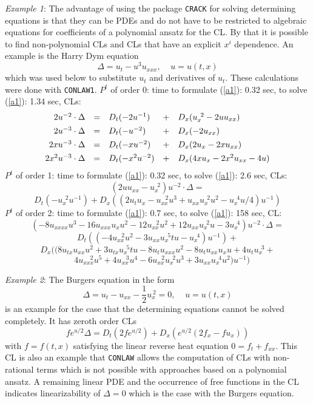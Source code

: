 {\it Example 1}: \newline
The advantage of using the package {\tt CRACK} for solving
determining equations is that they can be PDEs and do not have to be
restricted to algebraic equations for coefficients of a polynomial
ansatz for the CL. By that it is possible to find non-polynomial
CLs and CLs that have an explicit $x^i$ dependence.
An example is the Harry Dym equation
\[ \Delta = u_{t} - u^3u_{xxx}, \;\;\;\; u = u(t,x) \]
which was used below to substitute $u_{t}$ and derivatives of
$u_{t}$. These calculations were done with {\tt CONLAW1}.\newline
$P^t$ of order 0: time to formulate (\ref{a1}): 0.32 sec, to solve (\ref{a1}):
1.34 sec, CLs:
\[ \begin{array}{rclcl}
2u^{-2} \cdot \Delta & = & D_t(-2u^{-1}) & + & D_x(u_{x}^{\;\,2}-2uu_{xx}) \vspace{1.5mm} \\
2u^{-3} \cdot \Delta & = & D_t(-u^{-2}) & + & D_x(-2u_{xx}) \vspace{1.5mm} \\
2xu^{-3} \cdot \Delta & = & D_t(-xu^{-2}) & + & D_x(2u_{x}-2xu_{xx}) \vspace{1.5mm} \\
2x^2u^{-3} \cdot \Delta & = & D_t(-x^2u^{-2}) & + & D_x(4xu_{x}-2x^2u_{xx}-4u)
\end{array} \]
$P^t$ of order 1: time to formulate (\ref{a1}): 0.32 sec, to solve (\ref{a1}):
2.6 sec, CLs:
\[(2uu_{xx}-u_{x}^{\;\,2})u^{-2} \cdot \Delta = \]
\[D_t(-u_{x}^{\;\,2}u^{-1}) +
  D_x((2u_{t}u_{x}-u_{xx}^{\;\;\,2}u^3+
    u_{xx}u_{x}^{\;\,2}u^2-u_{x}^{\;\,4}u/4)u^{-1}) \]
$P^t$ of order 2: time to formulate (\ref{a1}): 0.7 sec, to solve (\ref{a1}):
158 sec, CL:
\[
(-8u_{xxxx}u^3-16u_{xxx}u_{x}u^2-12u_{xx}^{\;\;\,2}u^2
 +12u_{xx}u_{x}^{\;\,2}u-3u_{x}^{\;\,4})u^{-2} \cdot \Delta = \]
\[D_t((-4u_{xx}^{\;\;\,2}u^2-3u_{xx}u_{x}^{\;\,5}tu-u_{x}^{\;\,4})u^{-1}) + \]
\[D_x((8u_{tx}u_{xx}u^2+3u_{tx}u_{x}^{\;\,5}tu-8u_{t}u_{xxx}u^2
  -8u_{t}u_{xx}u_{x}u+4u_{t}u_{x}^{\;\,3}+\]
\[\;\;\;\,4u_{xxx}^{\;\;\;\,\,2}u^5
  +4u_{xx}^{\;\;\,3}u^4
  -6u_{xx}^{\;\;\,2}u_{x}^{\;\,2}u^3+3u_{xx}u_{x}^{\;\,4}u^2
 )u^{-1})
\]

{\it Example 2}: \newline
The Burgers equation in the form
\begin{equation}
 \Delta = u_t - u_{xx} - \frac{1}{2}u_x^{\,2} = 0, \;\;\;\; u = u(t,x)
 \label{BE1}
\end{equation}
is an example for the case that the determining equations cannot be
solved completely. It has zeroth order CLs
\begin{equation}
 fe^{u/2}\Delta = D_t(2fe^{u/2}) + D_x(e^{u/2}(2f_x-fu_x)) \label{BE1cl}
\end{equation}
with $f = f(t,x)$ satisfying the linear reverse heat equation
$0 = f_t + f_{xx}.$
This CL is also an example that {\tt CONLAW} allows the computation
of CLs with non-rational terms which is not possible with
approaches based on a polynomial ansatz.
A remaining linear PDE and the occurrence of free
functions in the CL indicates linearizability of $\Delta=0$ which
is the case with the Burgers equation.

